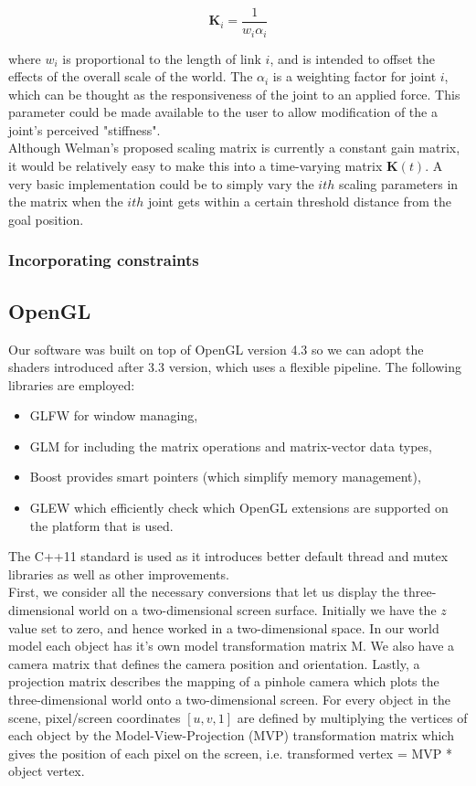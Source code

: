 \documentclass[paper=a4, fontsize=11pt]{scrartcl} %
\numberwithin{equation}{section} %
\numberwithin{figure}{section} %
\numberwithin{table}{section} %
\newcommand{\vect}[1]{\mathbf{#1}}
\begin{document}
\begin{equation}
\vect{K}_i = \frac{1}{w_i \alpha_i}
\end{equation}

where $w_i$ is proportional to the length of link $i$, and is intended to offset the effects of the overall scale of the world. The $\alpha_i$ is a weighting factor for joint $i$, which can be thought as the responsiveness of the joint to an applied force. This parameter could be made available to the user to allow modification of the a joint's perceived "stiffness". \\

Although Welman's proposed scaling matrix is currently a constant gain matrix, it would be relatively easy to make this into a time-varying matrix $\vect{K}(t)$. A very basic implementation could be to simply vary the $ith$ scaling parameters in the matrix when the $ith$ joint gets within a certain threshold distance from the goal position.

\subsubsection{Incorporating constraints}


\subsection{ OpenGL}
Our software was built on top of OpenGL version 4.3 so we can adopt the shaders introduced after 3.3 version, which uses a flexible pipeline. The following libraries are employed: 
\begin{itemize}
\item GLFW for window managing, 
\item GLM  for including the matrix operations and matrix-vector data types, 
\item Boost provides smart pointers (which simplify memory management), 
\item GLEW which efficiently check which OpenGL extensions are supported on the platform that is used. 
\end{itemize}
The C++11 standard is used as it introduces better default thread and mutex libraries as well as other improvements. \\


First, we consider all the necessary conversions that let us display the three-dimensional world on a two-dimensional screen surface. Initially we have the \(z\) value set to zero, and hence worked in a two-dimensional space. In our world model each object has it's own model transformation matrix M. We also have a camera matrix that defines the camera position and orientation. Lastly, a projection matrix describes the mapping of a pinhole camera which plots the three-dimensional world onto a two-dimensional screen. For every object in the scene, pixel/screen coordinates \([u, v, 1]\) are defined by multiplying the vertices of each object by the Model-View-Projection (MVP) transformation matrix which gives the position of each pixel on the screen, i.e. transformed vertex = MVP *  object vertex. \\
\end{document}
